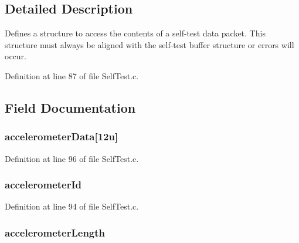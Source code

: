 \subsection{Detailed Description}
Defines a structure to access the contents of a self-\/test data packet. This structure must always be aligned with the self-\/test buffer structure or errors will occur. 

Definition at line 87 of file Self\-Test.\-c.



\subsection{Field Documentation}
\hypertarget{struct_self_test__t_a9e42aa177a6110ea7aa64266ef4e79b6}{
\subsubsection[{accelerometer\-Data}]{ accelerometer\-Data\mbox{[}12u\mbox{]}}}\label{struct_self_test__t_a9e42aa177a6110ea7aa64266ef4e79b6}


Definition at line 96 of file Self\-Test.\-c.

\hypertarget{struct_self_test__t_a4bdf449bf55ad41d91a2df5d1594ba54}{
\subsubsection[{accelerometer\-Id}]{ accelerometer\-Id}}\label{struct_self_test__t_a4bdf449bf55ad41d91a2df5d1594ba54}


Definition at line 94 of file Self\-Test.\-c.

\hypertarget{struct_self_test__t_a1e44737d2ef5b56f2b1c4461d7f2eb32}{
\subsubsection[{accelerometer\-Length}]{ accelerometer\-Length}}\label{struct_self_test__t_a1e44737d2ef5b56f2b1c4461d7f2eb32}


